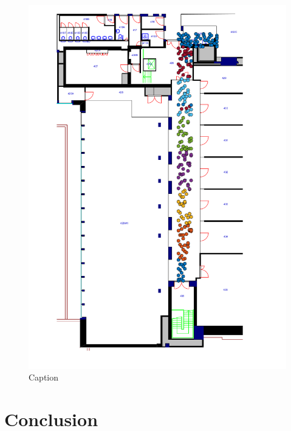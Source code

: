 \begin{figure}
\centering
\includegraphics[width=\textwidth]{./gfx/Chapter05/placeCellsExperiment_withDetection_5px.png}
\caption{Caption}
\label{}
\end{figure}

\section{Conclusion}

